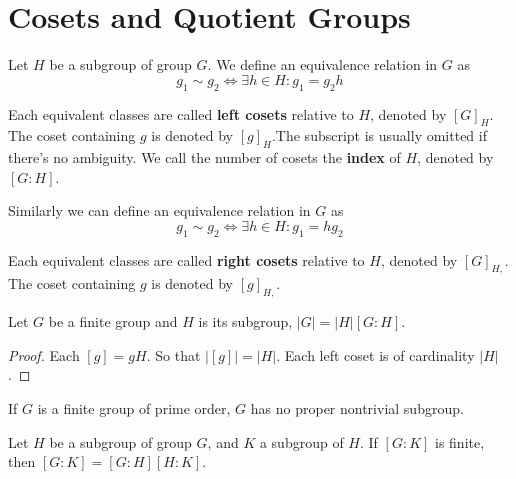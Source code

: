 \documentclass[12pt]{book}
\begin{document}
	\section{Cosets and Quotient Groups}
\begin{definition}
	Let $H$ be a subgroup of group $G$. We define an equivalence relation in $G$ as
	\begin{equation}
		g_1\sim g_2 \iff \exists h\in H: g_1=g_2 h
	\end{equation}
	
	Each equivalent classes are called \textbf{left cosets} relative to $H$, denoted by $[G]_H$. The coset containing $g$ is denoted by $[g]_H$.The subscript is usually omitted if there's no ambiguity. We call the number of cosets the \textbf{index} of $H$, denoted by $[G:H]$. 
\end{definition}

\begin{definition}
	Similarly we can define an equivalence relation in $G$ as
	\begin{equation}
		g_1\sim g_2 \iff \exists h\in H: g_1=h g_2
	\end{equation}
	
	Each equivalent classes are called \textbf{right cosets} relative to $H$, denoted by $[G]_{H,}$. The coset containing $g$ is denoted by $[g]_{H,}$. 
\end{definition}
	
	\begin{theorem}[Lagrange]
		Let $G$ be a finite group and $H$ is its subgroup, $|G|=|H|[G:H]$.
	\end{theorem}
	\begin{proof}
		Each $[g]=gH$. So that $|[g]|=|H|$. Each left coset is of cardinality $|H|$.
	\end{proof}
	\begin{corollary}
		If $G$ is a finite group of prime order, $G$ has no proper nontrivial subgroup.
	\end{corollary}
	
	\begin{corollary}
		Let $H$ be a subgroup of group $G$, and $K$ a subgroup of $H$. If $[G:K]$ is finite, then $[G:K]=[G:H][H:K]$.
	\end{corollary}
	
\end{document}
